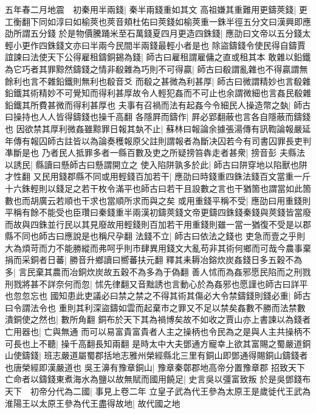 五年春二月地震　初秦用半兩錢|{
	秦半兩錢重如其文}
高祖嫌其重難用更鑄莢錢|{
	更工衡翻下同如淳曰如榆莢也莢音頬杜佑曰莢錢如榆莢重一銖半徑五分文曰漢興即應劭所謂五分錢}
於是物價騰踊米至石萬錢夏四月更造四銖錢|{
	應劭曰文帝以五分錢太輕小更作四銖錢文亦曰半兩今民間半兩錢最輕小者是也}
除盜鑄錢令使民得自鑄賈誼諫曰法使天下公得雇租鑄銅錫為錢|{
	師古曰雇租謂雇傭之直或租其本}
敢雜以鉛鐵為它巧者其罪黥然鑄錢之情非殽雜為巧則不可得贏|{
	師古曰殽謂亂雜也不得贏謂無餘利也言不雜鉛鐵則無利也殽音爻}
而殽之甚微為利甚厚|{
	師古曰微謂精妙也言殽雜鉛鐵其術精妙不可覺知而得利甚厚故令人輕犯姦而不可止也余謂微細也言姦民殽雜鉛鐵其所費甚微而得利甚厚也}
夫事有召禍而法有起姦今令細民人操造幣之埶|{
	師古曰操持也人人皆得鑄錢也操千高翻}
各隱屛而鑄作|{
	屛必郢翻蔽也言各自隱蔽而鑄錢也}
因欲禁其厚利微姦雖黥罪日報其埶不止|{
	蘇林曰報論余據張湯傳有訊鞫論報嚴延年傳有報囚師古註皆以為論奏穫報原父註則謂報者為斷决囚若今有司書囚罪長吏判凖斷是也}
乃者民人抵罪多者一縣百數及吏之所疑搒笞犇走者甚衆|{
	搒音彭}
夫縣法以誘民|{
	縣讀曰懸師古曰懸謂開立之}
使入陷阱孰多於此|{
	師古曰阱穿地以陷獸也阱才性翻}
又民用錢郡縣不同或用輕錢百加若干|{
	應劭曰時錢重四銖法錢百文當重一斤十六銖輕則以錢足之若干枚令滿平也師古曰若干且設數之言也干猶箇也謂當如此箇數也而胡廣云若順也干求也當順所求而與之矣}
或用重錢平稱不受|{
	應劭曰用重錢則平稱有餘不能受也臣瓚曰秦錢重半兩漢初鑄莢錢文帝更鑄四銖錢秦錢與莢錢皆當廢而故與四銖並行民以其見廢故用輕錢則百加若干用重錢則雖一當一猶復不受是以郡縣不同也師古曰應說是也稱尺孕翻}
法錢不立|{
	師古曰依法之錢也}
吏急而壹之乎則大為煩苛而力不能勝縱而弗呵乎則市肆異用錢文大亂苟非其術何鄉而可哉今農事棄捐而采銅者日蕃|{
	勝音升鄉讀曰嚮蕃扶元翻}
釋其耒耨冶鎔炊炭姦錢日多五穀不為多|{
	言民棄其農而冶銅炊炭故五穀不為多為于偽翻}
善人怵而為姦邪愿民陷而之刑戮刑戮將甚不詳奈何而忽|{
	怵先律翻又音黜誘也言動心於為姦邪也愿謹也師古曰詳平也忽忽忘也}
國知患此吏議必曰禁之禁之不得其術其傷必大令禁鑄錢則錢必重|{
	師古曰令謂法令也}
重則其利深盜鑄如雲而起棄市之罪又不足以禁矣姦數不勝而法禁數潰銅使之然也|{
	數所角翻}
銅布於天下其為禍博矣故不如收之賈山亦上書諫以為錢者亡用器也|{
	亡與無通}
而可以易富貴富貴者人主之操柄也令民為之是與人主共操柄不可長也上不聽|{
	操千高翻長知兩翻}
是時太中大夫鄧通方寵幸上欲其富賜之蜀嚴道銅山使鑄錢|{
	班志嚴道屬蜀郡括地志雅州榮經縣北三里有銅山即鄧通得賜銅山鑄錢者也唐榮經即漢嚴道也}
吳王濞有豫章銅山|{
	豫章秦鄣郡地高帝分置豫章郡}
招致天下亡命者以鑄錢東煮海水為鹽以故無賦而國用饒足|{
	史言吳以彊富致叛}
於是吳鄧錢布天下　初帝分代為二國|{
	事見上卷二年}
立皇子武為代王參為太原王是歲徙代王武為淮陽王以太原王參為代王盡得故地|{
	故代國之地}


